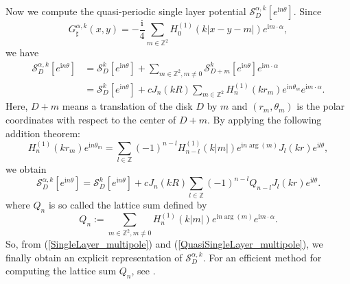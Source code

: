 \documentclass[11pt]{article}
\numberwithin{equation}{section}
\def\ri{{\mathrm{i}}}
\newcommand\1{{\ensuremath {\mathds 1} }}
\newcommand{\eqnref}[1]{(\ref {#1})}
\begin{document}
{{Now we compute the quasi-periodic single layer potential $\mathcal{S}_D^{\alpha,k}[e^{\ri n\theta}]$. Since 
$$ %
G_\sharp^{\alpha,k} (x,y) = -
\frac{ \ri}{4} \sum_{m \in \mathbb{Z}^2} H^{(1)}_0(k |x - y - m|)
e^{ \ri m \cdot\alpha},
$$
we have
\begin{align*}
\mathcal{S}_D^{\alpha,k}[e^{\ri n\theta}]
&=\mathcal{S}_D^{k}[e^{\ri n\theta}]+\sum_{m\in\mathbb{Z}^2, m\neq 0} \mathcal{S}^{k}_{D+m}[e^{\ri n\theta}]e^{\ri m\cdot\alpha}
\\
&=\mathcal{S}_D^{k}[e^{\ri n\theta}]+c J_n(k R) \sum_{m\in\mathbb{Z}^2} H_n^{(1)}(k r_m)e^{\ri n\theta_m}e^{\ri m\cdot\alpha}.
\end{align*}
Here, $D+m$ means a translation of the disk $D$ by $m$ and $(r_m,\theta_m)$ is the polar coordinates with respect to the center of $D+m$.
By applying the following addition theorem:
$$
H_n^{(1)}(k r_m)e^{\ri n\theta_m} = \sum_{l\in \mathbb{Z}}(-1)^{n-l} H_{n-l}^{(1)}(k|m|)e^{\ri n\arg(m)} J_l(k r)e^{\ri l\theta}, 
$$
we obtain
\begin{equation}\label{QuasiSingleLayer_multipole}
\mathcal{S}_D^{\alpha,k}[e^{\ri n\theta}] = 
\mathcal{S}_D^{k}[e^{\ri n\theta}]+
cJ_n(k R) \sum_{l \in \mathbb{Z}} (-1)^{n-l}Q_{n-l} J_l(k r)e^{\ri l\theta}.
\end{equation}
where $Q_n$ is so called the lattice sum defined by
$$
Q_n := \sum_{m\in \mathbb{Z}^2, m\neq 0} H_n^{(1)}(k|m|)e^{\ri n \arg(m)}e^{\ri m\cdot \alpha}.
$$
So, from \eqnref{SingleLayer_multipole} and \eqnref{QuasiSingleLayer_multipole}, we finally obtain an explicit representation of $\mathcal{S}_D^{\alpha,k}$. 
For an efficient method for computing the lattice sum $Q_n$, see \cite{Linton2010}.

}}
\end{document}
